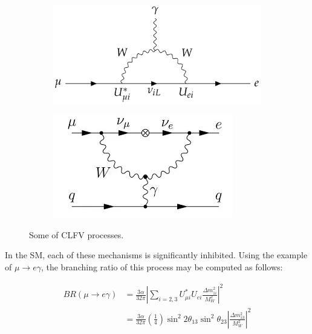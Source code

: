 \begin{figure}[!h]
     \begin{subfigure}[b]{0.4\linewidth}
         \centering
         \includegraphics[scale = 0.2]{figures/png/Screenshot_20240217_171058.png}
         \label{fig:mutoegamma}
     \end{subfigure}
     \begin{subfigure}[b]{0.7\linewidth}
         \centering
         \includegraphics[scale = 0.5]{figures/jpg/1_erkKoywyuFzJmMv4PKpc9Q.jpg}
         \label{fig:mutoeN}
     \end{subfigure}
     \caption{Some of CLFV processes.}
        \label{fig:three graphs2}
\end{figure}
In the SM, each of these mechanisms is significantly inhibited. Using the example of $\mu \rightarrow  e \gamma $, the branching ratio of this process may be computed as follows:

\begin{equation}\label{br}
\begin{aligned}
B R(\mu \rightarrow e \gamma) & =\frac{3 \alpha}{32 \pi}\left|\sum_{i=2,3} U_{\mu i}^* U_{e i} \frac{\Delta m_{1 i}^2}{M_W^2}\right|^2 \\
& =\frac{3 \alpha}{32 \pi}\left(\frac{1}{4}\right) \sin ^2 2 \theta_{13} \sin ^2 \theta_{23}\left|\frac{\Delta m_{13}^2}{M_W^2}\right|^2
\end{aligned}
\end{equation}

